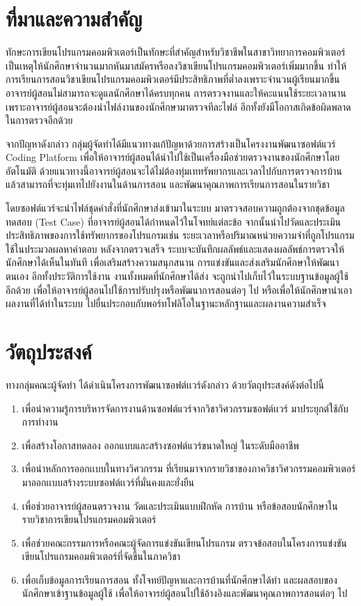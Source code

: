 \documentclass[12pt,one side,openright,a4paper]{cpe-thesis-th}
\newcommand{\thaijustify}[1]{%
  \par\hspace{30pt}\justifying
  #1
}
\begin{document}
\section{ที่มาและความสำคัญ}
    \thaijustify{
        ทักษะการเขียนโปรแกรมคอมพิวเตอร์เป็นทักษะที่สำคัญสำหรับวิชาชีพในสาขาวิทยาการคอมพิวเตอร์ เป็นเหตุให้นักศึกษาจำนวนมากหันมาสมัครหรือลงวิชาเขียนโปรแกรมคอมพิวเตอร์เพิ่มมากขึ้น ทำให้การเรียนการสอนวิชาเขียนโปรแกรมคอมพิวเตอร์มีประสิทธิภาพที่ต่ำลงเพราะจำนวนผู้เรียนมากขึ้น อาจารย์ผู้สอนไม่สามารถจะดูแลนักศึกษาได้ครบทุกคน การตรวจงานและให้คะแนนใช้ระยะเวลานาน เพราะอาจารย์ผู้สอนจะต้องนำไฟล์งานของนักศึกษามาตรวจทีละไฟล์ อีกทั้งยังมีโอกาสเกิดข้อผิดพลาดในการตรวจอีกด้วย
    }
    \thaijustify{
        จากปัญหาดังกล่าว กลุ่มผู้จัดทำได้มีแนวทางแก้ปัญหาด้วยการสร้างเป็นโครงงานพัฒนาซอฟต์แวร์ Coding Platform เพื่อให้อาจารย์ผู้สอนได้นำไปใช้เป็นเครื่องมือช่วยตรวจงานของนักศึกษาโดยอัตโนมัติ ด้วยแนวทางนี้อาจารย์ผู้สอนจะได้ไม่ต้องทุ่มเททรัพยากรและเวลาไปกับการตรวจการบ้าน แล้วสามารถที่จะทุ่มเทไปยังงานในด้านการสอน และพัฒนาคุณภาพการเรียนการสอนในรายวิชา
    }
    \thaijustify{
        โดยซอฟต์แวร์จะนำไฟล์ชุดคำสั่งที่นักศึกษาส่งเข้ามาในระบบ มาตรวจสอบความถูกต้องจากชุดข้อมูลทดสอบ (Test Case) ที่อาจารย์ผู้สอนได้กำหนดไว้ในโจทย์แต่ละข้อ จากนั้นนำไปวัดและประเมินประสิทธิภาพของการใช้ทรัพยากรของโปรแกรมเช่น ระยะเวลาหรือปริมาณหน่วยความจำที่ถูกโปรแกรมใช้ในประมวลผลหาคำตอบ หลังจากตรวจเสร็จ ระบบจะบันทึกผลลัพธ์และแสดงผลลัพธ์การตรวจให้นักศึกษาได้เห็นในทันที เพื่อเสริมสร้างความสนุกสนาน การแข่งขันและส่งเสริมนักศึกษาให้พัฒนาตนเอง อีกทั้งประวัติการใช้งาน งานทั้งหมดที่นักศึกษาได้ส่ง จะถูกนำไปเก็บไว้ในระบบฐานข้อมูลผู้ใช้อีกด้วย เพื่อให้อาจารย์ผู้สอนไปใช้การปรับปรุงหรือพัฒนาการสอนต่อๆ ไป หรือเพื่อให้นักศึกษานำเอาผลงานที่ได้ทำในระบบ ไปยื่นประกอบกับพอร์ทโฟลิโอในฐานะหลักฐานและผลงานความสำเร็จ
    }

\section{วัตถุประสงค์}
    ทางกลุ่มคณะผู้จัดทำ ได้ดำเนินโครงการพัฒนาซอฟต์เเวร์ดังกล่าว ด้วยวัตถุประสงค์ดังต่อไปนี้
    \begin{enumerate}
        \item เพื่อนำความรู้การบริหารจัดการงานด้านซอฟต์แวร์จากวิชาวิศวกรรมซอฟต์เเวร์ มาประยุกต์ใช้กับการทำงาน
        \item เพื่อสร้างโอกาสทดลอง ออกแบบและสร้างซอฟต์แวร์ขนาดใหญ่ ในระดับมืออาชีพ 
        \item เพื่อนำหลักการออกเเบบในทางวิศวกรรม ที่เรียนมาจากรายวิชาของภาควิชาวิศวกรรมคอมพิวเตอร์ มาออกเเบบสร้างระบบซอฟต์เเวร์ที่มั่นคงและยั่งยืน
        \item เพื่อช่วยอาจารย์ผู้สอนตรวจงาน วัดและประเมินแบบฝึกหัด การบ้าน หรือข้อสอบนักศึกษาในรายวิชาการเขียนโปรแกรมคอมพิวเตอร์ 
        \item เพื่อช่วยคณะกรรมการหรือคณะผู้จัดการแข่งขันเขียนโปรแกรม ตรวจข้อสอบในโครงการแข่งขันเขียนโปรแกรมคอมพิวเตอร์ที่จัดขึ้นในภาควิชา 
        \item เพื่อเก็บข้อมูลการเรียนการสอน ทั้งโจทย์ปัญหาและการบ้านที่นักศึกษาได้ทำ และผลสอบของนักศึกษาเข้าฐานข้อมูลผู้ใช้ เพื่อให้อาจารย์ผู้สอนไปใช้อ้างอิงและพัฒนาคุณภาพการสอนต่อๆ ไป
    \end{enumerate}
\end{document}
